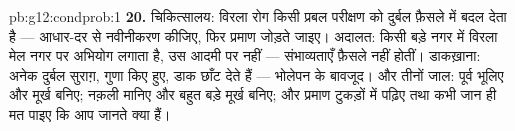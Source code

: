 \begin{solution}{pb:g12:condprob:1}
\textbf{20.} चिकित्सालय: विरला रोग किसी प्रबल परीक्षण को दुर्बल फ़ैसले में बदल
देता है --- आधार-दर से नवीनीकरण कीजिए, फिर प्रमाण जोड़ते जाइए। अदालत: किसी
बड़े नगर में विरला मेल नगर पर अभियोग लगाता है, उस आदमी पर नहीं --- संभाव्यताएँ
फ़ैसले नहीं होतीं। डाकख़ाना: अनेक दुर्बल सुराग़, गुणा किए हुए, डाक छाँट देते हैं
--- भोलेपन के बावजूद। और तीनों जाल: पूर्व  भूलिए और मूर्ख बनिए; नक़ली
 मानिए और बहुत बड़े मूर्ख बनिए; और प्रमाण टुकड़ों में पढ़िए तथा कभी
जान ही मत पाइए कि आप जानते क्या हैं।
\end{solution}
